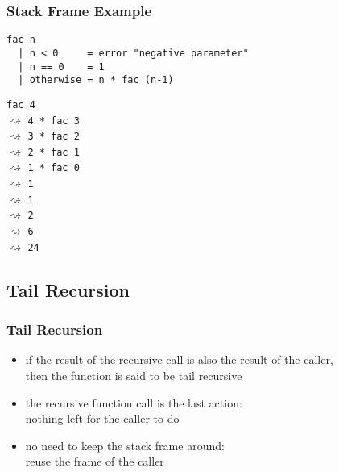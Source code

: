\documentclass[dvipsnames]{beamer}
\theoremstyle{plain}
\begin{document}
\begin{frame}[fragile]
  \frametitle{Stack Frame Example}

  \begin{lstlisting}
fac n
  | n < 0     = error "negative parameter"
  | n == 0    = 1
  | otherwise = n * fac (n-1)
  \end{lstlisting}

  \lstinline{fac 4}\\
  $\rightsquigarrow$ \lstinline{4 * fac 3}\\
  \hspace{38pt}$\rightsquigarrow$ \lstinline{3 * fac 2}\\
  \hspace{76pt}$\rightsquigarrow$ \lstinline{2 * fac 1}\\
  \hspace{114pt}$\rightsquigarrow$ \lstinline{1 * fac 0}\\
  \hspace{152pt}$\rightsquigarrow$ \lstinline{1}\\
  \hspace{114pt}$\rightsquigarrow$ \lstinline{1}\\
  \hspace{76pt}$\rightsquigarrow$ \lstinline{2}\\
  \hspace{38pt}$\rightsquigarrow$ \lstinline{6}\\
  $\rightsquigarrow$ \lstinline{24}\\
\end{frame}

\subsection{Tail Recursion}

\begin{frame}
  \frametitle{Tail Recursion}

  \begin{itemize}
    \item if the result of the recursive call is also the result of the caller,\\
      then the function is said to be \alert{tail recursive}
    \item the recursive function call is the last action:\\
      nothing left for the caller to do

    \pause
    \medskip
    \item no need to keep the stack frame around:\\
      reuse the frame of the caller
  \end{itemize}
\end{frame}
\end{document}
